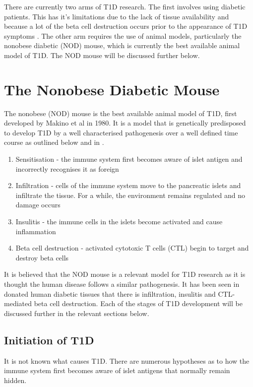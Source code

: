 There are currently two arms of T1D research.
The first involves using diabetic patients.
This has it's limitations due to the lack of tissue availability and because a lot of the beta cell destruction occurs prior to the appearance of T1D symptoms \citep{Thomas2000}.
The other arm requires the use of animal models, particularly the nonobese diabetic (NOD) mouse, which is currently the best available animal model of T1D.
The NOD mouse will be discussed further below.




\section{The Nonobese Diabetic Mouse}

The nonobese (NOD) mouse is the best available animal model of T1D, first developed by Makino et al  in 1980.
It is a model that is genetically predisposed to develop T1D by a well characterised pathogenesis over a well defined time course as outlined below and in .

\begin{enumerate}
\item Sensitisation - the immune system first becomes aware of islet antigen and incorrectly recognises it as foreign
\item Infiltration - cells of the immune system move to the pancreatic islets and infiltrate the tissue. For a while, the environment remains regulated and no damage occurs
\item Insulitis - the immune cells in the islets become activated and cause inflammation
\item Beta cell destruction - activated cytotoxic T cells (CTL) begin to target and destroy beta cells
\end{enumerate}

It is believed that the NOD mouse is a relevant model for T1D research as it is thought the human disease follows a similar pathogenesis.
It has been seen in donated human diabetic tissues that there is infiltration, insulitis and CTL-mediated beta cell destruction.
Each of the stages of T1D development will be discussed further in the relevant sections below.


\subsection{Initiation of T1D}

It is not known what causes T1D.
There are numerous hypotheses as to how the immune system first becomes aware of islet antigens that normally remain hidden.

